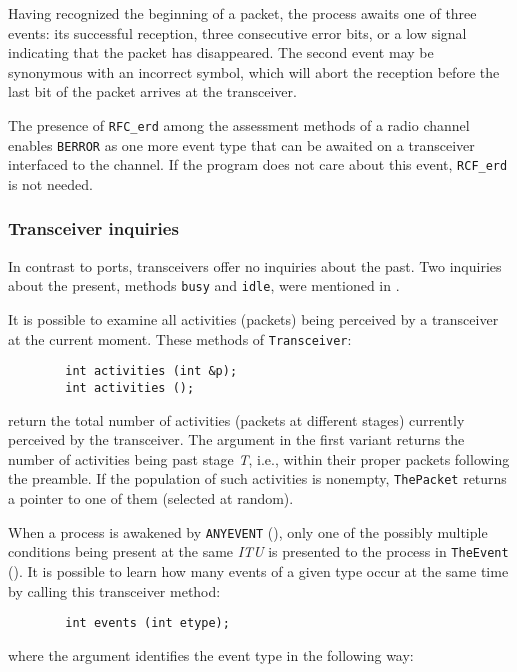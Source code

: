Having recognized the beginning of a packet, the process awaits one of three
events: its successful reception, three consecutive error bits, or a low
signal indicating that the packet has disappeared.
The second event may be synonymous with an incorrect symbol, which will
abort the reception before the last bit of the packet arrives at the
transceiver.

\medskip

The presence of {\tt RFC\_erd} among the assessment methods of a radio
channel enables {\tt BERROR} as one more event type that can be awaited on
a transceiver interfaced to the channel.
If the program does not care about this event, {\tt RCF\_erd} is not needed.

\subsubsection{Transceiver inquiries}
\label{rm_tr_pp_ti}

In contrast to ports, transceivers offer no inquiries about the past.
Two inquiries about the present, methods {\tt busy} and {\tt idle},
were mentioned in .

It is possible to examine all activities (packets)
being perceived by a transceiver at the current moment.
These methods of {\tt Transceiver}:
\begin{verbatim}
        int activities (int &p);
        int activities ();
\end{verbatim}
\noindent
return the total number of activities (packets at different stages) currently
perceived by the transceiver.
The argument in
the first variant returns the number of activities
being past stage {\em T}, i.e., within their proper packets following the
preamble.
If the population of such activities is nonempty,
{\tt ThePacket} returns a pointer to one of them (selected at random).

When a process is awakened by {\tt ANYEVENT} (),
only one of the possibly multiple conditions being present at the same
{\em ITU\/} is presented to the process in {\tt TheEvent} ().
It is possible to learn how many events of a given type
occur at the same time by calling this transceiver method:
\begin{verbatim}
        int events (int etype);
\end{verbatim}
\noindent
where the argument identifies the event type in the following way:

\bigskip

